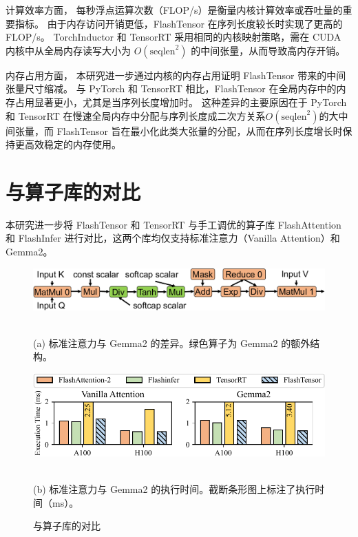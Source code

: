 计算效率方面，
每秒浮点运算次数（FLOP/s）是衡量内核计算效率或吞吐量的重要指标。
由于内存访问开销更低，FlashTensor 在序列长度较长时实现了更高的 FLOP/s。
TorchInductor 和 TensorRT 采用相同的内核映射策略，需在 CUDA 内核中从全局内存读写大小为 $O(\text{seqlen}^2)$ 的中间张量，从而导致高内存开销。  

内存占用方面，
本研究进一步通过内核的内存占用证明 FlashTensor 带来的中间张量尺寸缩减。
与 PyTorch 和 TensorRT 相比，FlashTensor 在全局内存中的内存占用显著更小，尤其是当序列长度增加时。
这种差异的主要原因在于 PyTorch 和 TensorRT 在慢速全局内存中分配与序列长度成二次方关系$O(\text{seqlen}^2)$的大中间张量，而 FlashTensor 旨在最小化此类大张量的分配，从而在序列长度增长时保持更高效稳定的内存使用。  


\section{与算子库的对比}
本研究进一步将 FlashTensor 和 TensorRT 与手工调优的算子库 FlashAttention 和 FlashInfer 进行对比，这两个库均仅支持标准注意力（Vanilla Attention）和 Gemma2。  

\begin{figure}[htbp]
    \centering
    \begin{minipage}[ht]{\linewidth}
        \includegraphics[width=\linewidth]{figures/flashtensor/exp_gemma2-crop.pdf}
    \end{minipage}
    \\
\centering \small (a) 标准注意力与 Gemma2 的差异。绿色算子为 Gemma2 的额外结构。  
    \begin{minipage}[ht]{\linewidth}
        \includegraphics[width=\linewidth]{figures/flashtensor/attn_time-crop.pdf}
    \end{minipage}
    \\
\centering \small (b) 标准注意力与 Gemma2 的执行时间。截断条形图上标注了执行时间（ms）。  
    \caption{与算子库的对比}
    \label{fig:lib_cmp}
\end{figure}  

